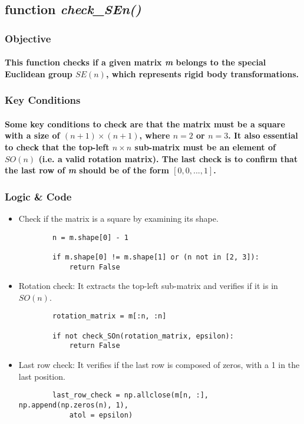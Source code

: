 \documentclass[12pt, letterpaper]{article}
\begin{document}
\subsection{function \textit{check\_SEn()}}
\subsubsection{Objective}
\paragraph{This function checks if a given matrix \textit{m} belongs to the special Euclidean group $SE(n)$, which represents rigid body transformations.}
\subsubsection{Key Conditions}
\paragraph{Some key conditions to check are that the matrix must be a square with a size of $(n + 1) \times (n + 1)$, where $n = 2$ or $n = 3$. It also essential to check that the top-left $n \times n$ sub-matrix must be an element of $SO(n)$ (i.e. a valid rotation matrix). The last check is to confirm that the last row of \textit{m} should be of the form $[0, 0, ..., 1]$.}
\subsubsection{Logic \& Code}
\begin{itemize}
    \item{Check if the matrix is a square by examining its shape.}
    \begin{verbatim}
        n = m.shape[0] - 1
    
        if m.shape[0] != m.shape[1] or (n not in [2, 3]):
            return False
    \end{verbatim}
    \item{Rotation check: It extracts the top-left sub-matrix and verifies if it is in $SO(n)$.}
    \begin{verbatim}
        rotation_matrix = m[:n, :n]
    
        if not check_SOn(rotation_matrix, epsilon):
            return False
    \end{verbatim}
    \item{Last row check: It verifies if the last row is composed of zeros, with a 1 in the last position.}
    \begin{verbatim}
        last_row_check = np.allclose(m[n, :], np.append(np.zeros(n), 1), 
            atol = epsilon)
    \end{verbatim}
\end{itemize}
\end{document}
